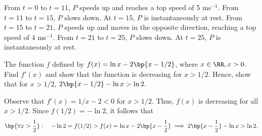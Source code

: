 \begin{solution}
    \begin{ppart}
        From $t = 0$ to $t = 11$, $P$ speeds up and reaches a top speed of 5 ms$^{-1}$. From $t=11$ to $t=15$, $P$ slows down. At $t=15$, $P$ is instantaneously at rest. From $t=15$ to $t=21$, $P$ speeds up and moves in the opposite direction, reaching a top speed of 4 ms$^{-1}$. From $t=21$ to $t=25$, $P$ slows down. At $t=25$, $P$ is instantaneously at rest.
    \end{ppart}
    \clearpage
    \begin{ppart}
        \begin{center}
        \end{center}
    \end{ppart}
\end{solution}

\begin{problem}
    The function $f$ defined by $f(x) = \ln x - 2\bp{x-1/2}$, where $x \in \RR, x > 0$. Find $f'(x)$ and show that the function is decreasing for $x > 1/2$. Hence, show that for $x > 1/2$, $2\bp{x - 1/2} - \ln x > \ln 2$.
\end{problem}
\begin{solution}
    Observe that $f'(x) = 1/x - 2 < 0$ for $x > 1/2$. Thus, $f(x)$ is decreasing for all $x > 1/2$. Since $f(1/2) = -\ln 2$, it follows that \[\bp{\forall x > \frac12}: \quad -\ln 2 = f(1/2) > f(x) = \ln x - 2\bp{x - \frac12} \implies 2\bp{x - \frac12} - \ln x > \ln 2.\]
\end{solution}